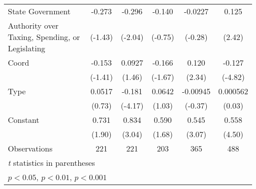 {\begin{tabular}{l*{5}{c}}
\addlinespace
State Government&   -0.273         &   -0.296\sym{*}  &   -0.140         &  -0.0227         &    0.125\sym{*}  \\
Authority over Taxing, Spending, or Legislating&  (-1.43)         &  (-2.04)         &  (-0.75)         &  (-0.28)         &   (2.42)         \\
\addlinespace
Coord           &   -0.153         &   0.0927         &   -0.166         &    0.120\sym{*}  &   -0.127\sym{***}\\
                &  (-1.41)         &   (1.46)         &  (-1.67)         &   (2.34)         &  (-4.82)         \\
\addlinespace
Type            &   0.0517         &   -0.181\sym{***}&   0.0642         & -0.00945         & 0.000562         \\
                &   (0.73)         &  (-4.17)         &   (1.03)         &  (-0.37)         &   (0.03)         \\
\addlinespace
Constant        &    0.731         &    0.834\sym{**} &    0.590         &    0.545\sym{**} &    0.558\sym{***}\\
                &   (1.90)         &   (3.04)         &   (1.68)         &   (3.07)         &   (4.50)         \\
\midrule
Observations    &      221         &      221         &      203         &      365         &      488         \\
\bottomrule
\multicolumn{6}{l}{\footnotesize \textit{t} statistics in parentheses}\\
\multicolumn{6}{l}{\footnotesize \sym{*} \(p<0.05\), \sym{**} \(p<0.01\), \sym{***} \(p<0.001\)}\\
\end{tabular}
}
